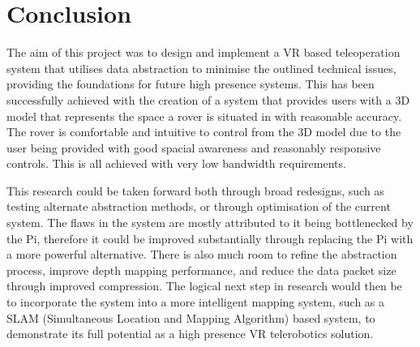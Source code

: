 \chapter{Conclusion}
\label{chapter:conclusion}

The aim of this project was to design and implement a VR based teleoperation system that utilises data abstraction to minimise the outlined technical issues, providing the foundations for future high presence systems. This has been successfully achieved with the creation of a system that provides users with a 3D model that represents the space a rover is situated in with reasonable accuracy. The rover is comfortable and intuitive to control from the 3D model due to the user being provided with good spacial awareness and reasonably responsive controls. This is all achieved with very low bandwidth requirements.

This research could be taken forward both through broad redesigns, such as testing alternate abstraction methods, or through optimisation of the current system. The flaws in the system are mostly attributed to it being bottlenecked by the Pi, therefore it could be improved substantially through replacing the Pi with a more powerful alternative. There is also much room to refine the abstraction process, improve depth mapping performance, and reduce the data packet size through improved compression. The logical next step in research would then be to incorporate the system into a more intelligent mapping system, such as a SLAM (Simultaneous Location and Mapping Algorithm) based system, to demonstrate its full potential as a high presence VR telerobotics solution.